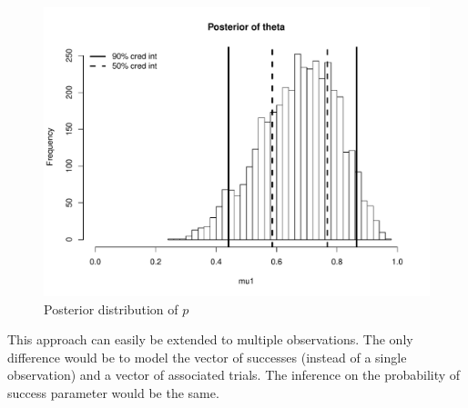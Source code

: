 \documentclass[12pt]{article}
\begin{document}
\begin{figure}[H]\caption[]{Posterior distribution of $p$}
\centering
\begin{minipage}{0.6\linewidth}
\includegraphics[trim={0cm 0cm 0cm 1.5cm}, clip, scale=0.6]{../figs/bin1.pdf}
\end{minipage}
\end{figure}

\noindent This approach can easily be extended to multiple observations. The only difference would be to model the vector of successes (instead of a single observation) and a vector of associated trials. The inference on the probability of success parameter would be the same. \\
\end{document}
